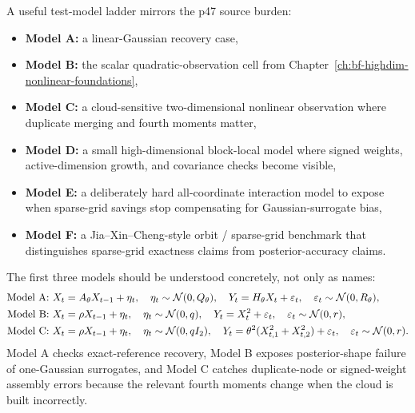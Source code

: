 A useful test-model ladder mirrors the p47 source burden:
\begin{itemize}[leftmargin=0.28in]
  \item \textbf{Model A:} a linear-Gaussian recovery case,
  \item \textbf{Model B:} the scalar quadratic-observation cell from
  Chapter~\ref{ch:bf-highdim-nonlinear-foundations},
  \item \textbf{Model C:} a cloud-sensitive two-dimensional nonlinear observation
  where duplicate merging and fourth moments matter,
  \item \textbf{Model D:} a small high-dimensional block-local model where signed
  weights, active-dimension growth, and covariance checks become visible,
  \item \textbf{Model E:} a deliberately hard all-coordinate interaction model to
  expose when sparse-grid savings stop compensating for Gaussian-surrogate bias,
  \item \textbf{Model F:} a Jia--Xin--Cheng-style orbit / sparse-grid benchmark
  that distinguishes sparse-grid exactness claims from posterior-accuracy claims.
\end{itemize}
The first three models should be understood concretely, not only as names:
\begin{align}
  \text{Model A: }&
  X_t=A_\theta X_{t-1}+\eta_t,
  \quad
  \eta_t\sim\mathcal{N}(0,Q_\theta),
  \quad
  Y_t=H_\theta X_t+\varepsilon_t,
  \quad
  \varepsilon_t\sim\mathcal{N}(0,R_\theta),
  \label{eq:bf-hd-sgqf-model-A}\\
  \text{Model B: }&
  X_t=\rho X_{t-1}+\eta_t,
  \quad
  \eta_t\sim\mathcal{N}(0,q),
  \quad
  Y_t=X_t^2+\varepsilon_t,
  \quad
  \varepsilon_t\sim\mathcal{N}(0,r),
  \label{eq:bf-hd-sgqf-model-B}\\
  \text{Model C: }&
  X_t=\rho X_{t-1}+\eta_t,
  \quad
  \eta_t\sim\mathcal{N}(0,qI_2),
  \quad
  Y_t=\theta^2(X_{t,1}^2+X_{t,2}^2)+\varepsilon_t,
  \quad
  \varepsilon_t\sim\mathcal{N}(0,r).
  \label{eq:bf-hd-sgqf-model-C}
\end{align}
Model A checks exact-reference recovery, Model B exposes posterior-shape failure
of one-Gaussian surrogates, and Model C catches duplicate-node or signed-weight
assembly errors because the relevant fourth moments change when the cloud is
built incorrectly.

